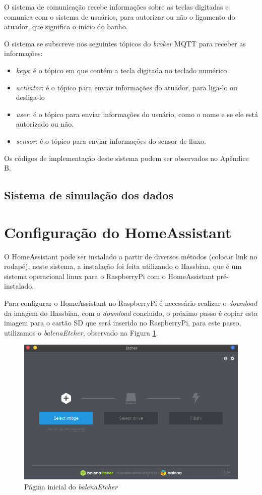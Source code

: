 O sistema de comunicação recebe informações sobre as teclas digitadas e comunica com o sistema de usuários, para autorizar ou não o ligamento do atuador, que significa o início do banho.

O sistema se subscreve nos seguintes tópicos do \textit{broker} MQTT para receber as informações:

\begin{itemize}
	\item \textit{keys}: é o tópico em que contém a tecla digitada no teclado numérico
	\item \textit{actuator}: é o tópico para enviar informações do atuador, para liga-lo ou desliga-lo
	\item \textit{user}: é o tópico para enviar informações do usuário, como o nome e se ele está autorizado ou não.
	\item \textit{sensor}: é o tópico para enviar informações do sensor de fluxo.
\end{itemize}

Os códigos de implementação deste sistema podem ser observados no Apêndice B.

\subsection{Sistema de simulação dos dados}



\section{Configuração do HomeAssistant}

O HomeAssistant pode ser instalado a partir de diversos métodos (colocar link no rodapé), neste sistema, a instalação foi feita utilizando o Hassbian, que é um sistema operacional linux para o RaspberryPi com o HomeAssistant pré-instalado.

Para configurar o HomeAssistant no RaspberryPi é necessário realizar o \textit{download} da imagem do Hassbian, com o \textit{download} concluído, o próximo passo é copiar esta imagem para o cartão SD que será inserido no RaspberryPi, para este passo, utilizamos o \textit{balenaEtcher}, observado na Figura \ref{fig:etcher}.

\begin{figure}[htbp]
	\centering
	\includegraphics[width=0.5\linewidth]{figuras/etcher.png}
	\caption{Página inicial do \textit{balenaEtcher}}
	\label{fig:etcher}
\end{figure}

